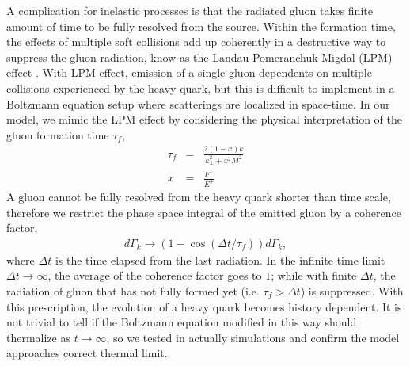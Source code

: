 \documentclass[aps, prc, reprint, amsmath, groupedaddress, nofootinbib]{revtex4-1}
\begin{document}
A complication for inelastic processes is that the radiated gluon takes finite amount of time to be fully resolved from the source. 
Within the formation time, the effects of multiple soft collisions add up  coherently in a destructive way to suppress the gluon radiation, know as the Landau-Pomeranchuk-Migdal (LPM) effect \cite{}.
With LPM effect, emission of a single gluon dependents on multiple collisions experienced by the heavy quark, but this is difficult to implement in a Boltzmann equation setup where scatterings are localized in space-time.
In our model, we mimic the LPM effect by considering the physical interpretation of the gluon formation time $\tau_f$,
\begin{eqnarray}
\tau_f &=& \frac{2(1-x)k}{k_\perp^2 + x^2M^2} \\
x &=& \frac{k^+}{E^+}
\end{eqnarray}
A gluon cannot be fully resolved from the heavy quark shorter than time scale, therefore we restrict the phase space integral of the emitted gluon   by a coherence factor,
\begin{eqnarray}
d\Gamma_k \rightarrow \left(1 - \cos\left(\Delta t/\tau_f\right) \right)d\Gamma_k,
\end{eqnarray}
where $\Delta t$ is the time elapsed from the last radiation.
In the infinite time limit $\Delta t \rightarrow \infty$, the average of the coherence factor goes to $1$; while with finite $\Delta t$, the radiation of gluon that has not fully formed yet (i.e. $\tau_f > \Delta t$) is suppressed.
With this prescription, the evolution of a heavy quark becomes history dependent. 
It is not trivial to tell if the Boltzmann equation modified in this way should thermalize as $t\rightarrow \infty$, so we tested in actually simulations and confirm the model approaches correct thermal limit.
\end{document}
